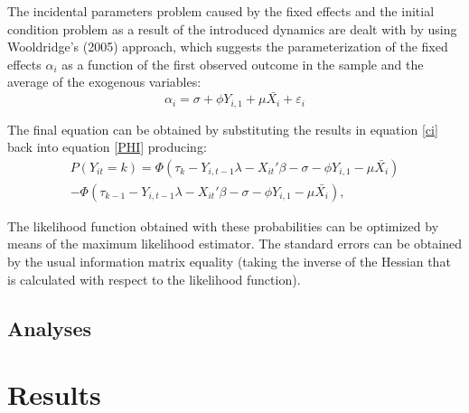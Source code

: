 \documentclass[12pt]{article}
\begin{document}
The incidental parameters problem caused by the fixed effects and the initial condition problem as a result of the introduced dynamics are dealt with by using Wooldridge's (2005) approach, which suggests the parameterization of the fixed effects $\alpha_{i}$ as a function of the first observed outcome in the sample and the average of the exogenous variables: 
\begin{equation}
\label{ci}
    \alpha_{i} = \sigma + \phi Y_{i,1} + \mu \bar{X_{i}}  + \varepsilon_{i}
\end{equation}

The final equation can be obtained by substituting the results in equation \ref{ci} back into equation \ref{PHI} producing:
\begin{equation}
    \begin{split}
         P(Y_{it}=k) = \Phi(\tau_{k} - Y_{i,t-1}\lambda - X_{it}'\beta - \sigma - \phi Y_{i,1} - \mu \bar{X_{i}}) \\ - \Phi(\tau_{k-1} - Y_{i,t-1}\lambda - X_{it}'\beta - \sigma - \phi Y_{i,1} - \mu \bar{X_{i}}), 
    \end{split}
\end{equation}

The likelihood function obtained with these probabilities can be optimized by means of the maximum likelihood estimator. The standard errors can be obtained by the usual information matrix equality (taking the inverse of the Hessian that is calculated with respect to the likelihood function). 

\subsection{Analyses}

\FloatBarrier


\clearpage

\section{Results}
\end{document}

